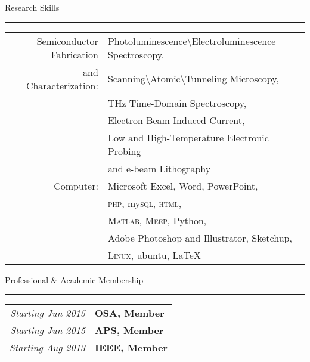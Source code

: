 \begin{vita}
\newpage
{\Large\scshape\raggedright{Research Skills}}
\newline
\rule{\textwidth}{1pt}
\begin{tabular}{rl}
 Semiconductor Fabrication & Photoluminescence\textbackslash Electroluminescence Spectroscopy, \\
 and Characterization:& Scanning\textbackslash Atomic\textbackslash Tunneling Microscopy, \\
 & THz Time-Domain Spectroscopy,\\
 & Electron Beam Induced Current,\\ 
 & Low and High-Temperature Electronic Probing \\
 & and e-beam Lithography\\
Computer:& Microsoft Excel, Word, PowerPoint, \\
& \textsc{php}, my\textsc{sql}, \textsc{html},  \\
& \textsc{Matlab}, \textsc{Meep}, Python, \\
& Adobe Photoshop and Illustrator, Sketchup, \\ 
& \textsc{Linux}, ubuntu, {\LaTeX}\\
\end{tabular}

{\Large\scshape\raggedright{Professional \& Academic Membership}}
\newline
\rule{\textwidth}{1pt}
\begin{tabular}{rl} 
\emph{Starting Jun 2015} & \textbf{OSA, Member}\\
\emph{Starting Jun 2015} & \textbf{APS, Member}\\
\emph{Starting Aug 2013} & \textbf{IEEE, Member}\\
\end{tabular}


\end{vita}
